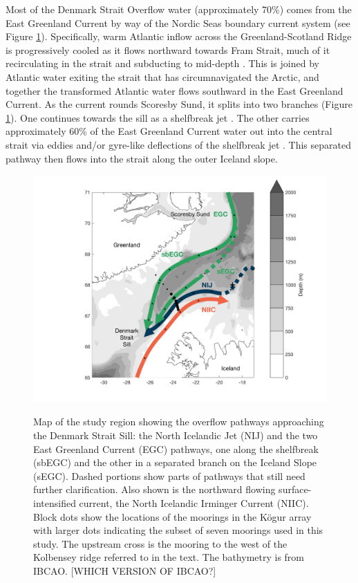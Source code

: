 \documentclass[12pt,titlepage,figuresatend]{article}
\begin{document}
Most of the Denmark Strait Overflow water (approximately 70\%) comes from the East Greenland Current by way of the Nordic Seas boundary current system \cite[]{Vage2013,Harden2016} (see Figure \ref{mainmap}). Specifically, warm Atlantic inflow across the Greenland-Scotland Ridge is progressively cooled as it flows northward towards Fram Strait, much of it recirculating in the strait and subducting to mid-depth \citep[]{Mauritzen1996}. This is joined by Atlantic water exiting the strait that has circumnavigated the Arctic, and together the transformed Atlantic water flows southward in the East Greenland Current.  As the current rounds Scoresby Sund, it splits into two branches (Figure \ref{mainmap}). One continues towards the sill as a shelfbreak jet \cite[]{Havik2017}. The other carries approximately 60\% of the East Greenland Current water out into the central strait via eddies and/or gyre-like deflections of the shelfbreak jet \cite[]{Vage2013,Harden2016}. This separated pathway then flows into the strait along the outer Iceland slope. 


\begin{figure}[p!]
  \centering\includegraphics[width=\hsize]{./figures/mainmap.pdf}
  \caption{Map of the study region showing the overflow pathways approaching the Denmark Strait Sill: the North Icelandic Jet (NIJ) and the two East Greenland Current (EGC) pathways, one along the shelfbreak (sbEGC) and the other in a separated branch on the Iceland Slope (sEGC). Dashed portions show parts of pathways that still need further clarification. Also shown is the northward flowing surface-intensified current, the North Icelandic Irminger Current (NIIC). Block dots show the locations of the moorings in the K\"{o}gur array with larger dots indicating the subset of seven moorings used in this study. The upstream cross is the mooring to the west of the Kolbensey ridge referred to in the text. The bathymetry is from IBCAO. [WHICH VERSION OF IBCAO?]}{\label{mainmap}}
\end{figure}
\end{document}
